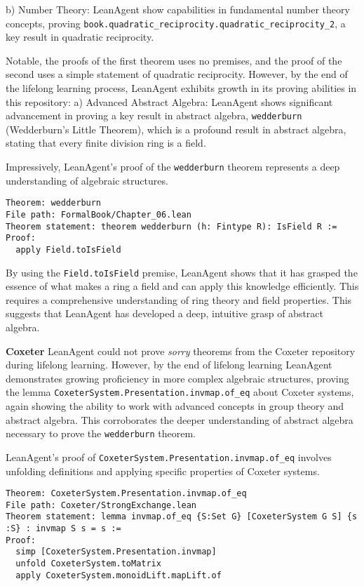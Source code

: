 \documentclass{article} %
\begin{document}
b) Number Theory:
LeanAgent show capabilities in fundamental number theory concepts, proving \texttt{book.quadratic\_reciprocity.quadratic\_reciprocity\_2}, a key result in quadratic reciprocity.

Notable, the proofs of the first theorem uses no premises, and the proof of the second uses a simple statement of quadratic reciprocity. However, by the end of the lifelong learning process, LeanAgent exhibits growth in its proving abilities in this repository:
a) Advanced Abstract Algebra:
LeanAgent shows significant advancement in proving a key result in abstract algebra, \texttt{wedderburn} (Wedderburn's Little Theorem), which is a profound result in abstract algebra, stating that every finite division ring is a field.

Impressively, LeanAgent's proof of the \texttt{wedderburn} theorem represents a deep understanding of algebraic structures.

\begin{verbatim}
Theorem: wedderburn
File path: FormalBook/Chapter_06.lean
Theorem statement: theorem wedderburn (h: Fintype R): IsField R :=
Proof:
  apply Field.toIsField
\end{verbatim}

By using the \texttt{Field.toIsField} premise, LeanAgent shows that it has grasped the essence of what makes a ring a field and can apply this knowledge efficiently. This requires a comprehensive understanding of ring theory and field properties. This suggests that LeanAgent has developed a deep, intuitive grasp of abstract algebra.

\textbf{Coxeter} LeanAgent could not prove \textit{sorry} theorems from the Coxeter repository during lifelong learning. However, by the end of lifelong learning LeanAgent demonstrates growing proficiency in more complex algebraic structures, proving the lemma \texttt{CoxeterSystem.Presentation.invmap.of\_eq} about Coxeter systems, again showing the ability to work with advanced concepts in group theory and abstract algebra. This corroborates the deeper understanding of abstract algebra necessary to prove the \texttt{wedderburn} theorem.

LeanAgent's proof of \texttt{CoxeterSystem.Presentation.invmap.of\_eq} involves unfolding definitions and applying specific properties of Coxeter systems.

\begin{verbatim}
Theorem: CoxeterSystem.Presentation.invmap.of_eq
File path: Coxeter/StrongExchange.lean
Theorem statement: lemma invmap.of_eq {S:Set G} [CoxeterSystem G S] {s :S} : invmap S s = s :=
Proof:
  simp [CoxeterSystem.Presentation.invmap]
  unfold CoxeterSystem.toMatrix
  apply CoxeterSystem.monoidLift.mapLift.of
\end{verbatim}
\end{document}
